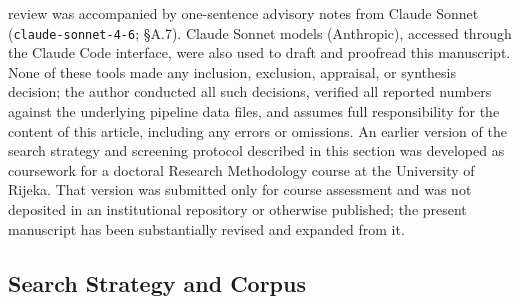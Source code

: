 review was accompanied by one-sentence advisory notes from Claude Sonnet
(\texttt{claude-sonnet-4-6}; \S A.7). Claude Sonnet models (Anthropic),
accessed through the Claude Code interface, were also used to draft and
proofread this manuscript. None of these tools made any
inclusion, exclusion, appraisal, or synthesis decision; the author conducted
all such decisions, verified all reported numbers against the underlying
pipeline data files, and assumes full responsibility for the content of this
article, including any errors or omissions. An earlier version of the search strategy
and screening protocol described in this section was developed as coursework
for a doctoral Research Methodology course at the University of Rijeka. That
version was submitted only for course assessment and was not deposited in an
institutional repository or otherwise published; the present manuscript has
been substantially revised and expanded from it.

\subsection{Search Strategy and Corpus}
\label{sec:methodology:search}

